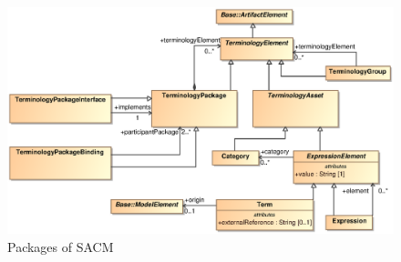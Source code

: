 \begin{figure}
	\centering
	\includegraphics[width=1\linewidth]{fig/Terminology.eps}
	\caption{Packages of SACM}
	\label{fig:term}
\end{figure}

